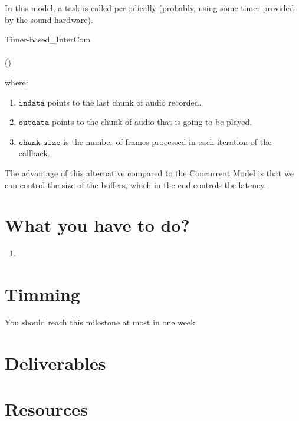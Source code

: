 In this model, a task is called periodically (probably, using some
timer provided by the sound hardware).

\begin{pseudocode}{Timer-based\_InterCom}{~}
  \BEGIN
     \GETS {}\\
    
    \\
    ()\\
  \END
  \ENDPROCEDURE
\end{pseudocode}

where:
\begin{enumerate}
\item $\mathtt{indata}$ points to the last chunk of audio recorded.
\item $\mathtt{outdata}$ points to the chunk of audio that is going to be played.
\item $\mathtt{chunk\_size}$ is the number of frames processed in each iteration of the callback.
\end{enumerate}

The advantage of this alternative compared to the Concurrent Model is
that we can control the size of the buffers, which in the end controls the latency.

\section{What you have to do?}

\begin{enumerate}

\item
  
\end{enumerate}

\section{Timming}

You should reach this milestone at most in one week.

\section{Deliverables}

\section{Resources}


